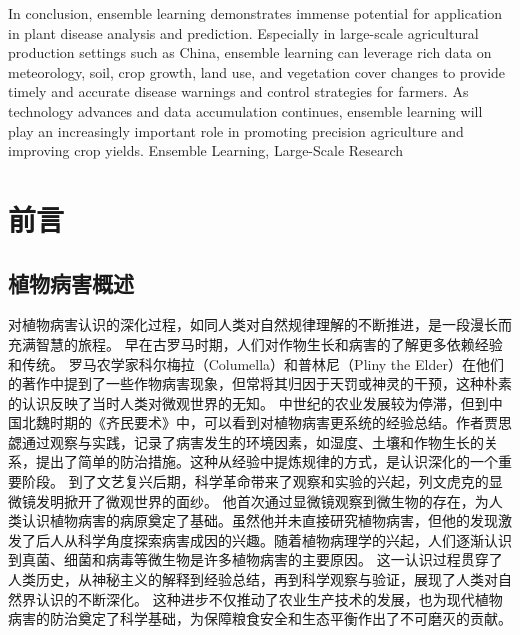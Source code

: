 \documentclass[AutoFakeBold]{LZUThesis-PgD&PhD}
\begin{document}
{In conclusion, ensemble learning demonstrates immense potential for application in plant disease analysis and prediction. Especially in large-scale agricultural production settings such as China, ensemble learning can leverage rich data on meteorology, soil, crop growth, land use, and vegetation cover changes to provide timely and accurate disease warnings and control strategies for farmers. As technology advances and data accumulation continues, ensemble learning will play an increasingly important role in promoting precision agriculture and improving crop yields.    %
}{Ensemble Learning, Large-Scale Research}


\mainmatter



\chapter{前言}

\section{植物病害概述}


对植物病害认识的深化过程，如同人类对自然规律理解的不断推进，是一段漫长而充满智慧的旅程。
早在古罗马时期，人们对作物生长和病害的了解更多依赖经验和传统。
罗马农学家科尔梅拉（Columella）和普林尼（Pliny the Elder）在他们的著作中提到了一些作物病害现象，但常将其归因于天罚或神灵的干预，这种朴素的认识反映了当时人类对微观世界的无知。
中世纪的农业发展较为停滞，但到中国北魏时期的《齐民要术》中，可以看到对植物病害更系统的经验总结。作者贾思勰通过观察与实践，记录了病害发生的环境因素，如湿度、土壤和作物生长的关系，提出了简单的防治措施。这种从经验中提炼规律的方式，是认识深化的一个重要阶段。
到了文艺复兴后期，科学革命带来了观察和实验的兴起，列文虎克的显微镜发明掀开了微观世界的面纱。
他首次通过显微镜观察到微生物的存在，为人类认识植物病害的病原奠定了基础。虽然他并未直接研究植物病害，但他的发现激发了后人从科学角度探索病害成因的兴趣。随着植物病理学的兴起，人们逐渐认识到真菌、细菌和病毒等微生物是许多植物病害的主要原因。
这一认识过程贯穿了人类历史，从神秘主义的解释到经验总结，再到科学观察与验证，展现了人类对自然界认识的不断深化。
这种进步不仅推动了农业生产技术的发展，也为现代植物病害的防治奠定了科学基础，为保障粮食安全和生态平衡作出了不可磨灭的贡献。
\end{document}
